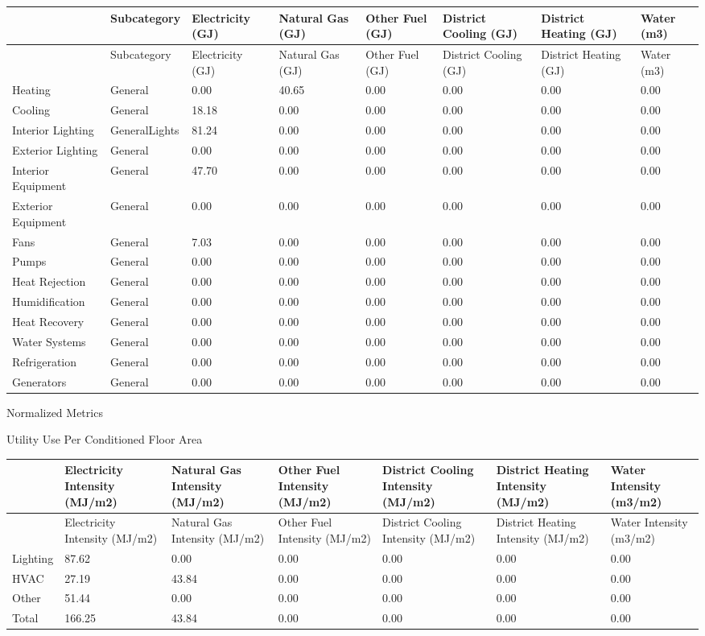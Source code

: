 {\scriptsize
\begin{longtable}[c]{>{\raggedright}p{0.75in}>{\raggedright}p{0.75in}>{\raggedright}p{0.75in}>{\raggedright}p{0.75in}>{\raggedright}p{0.75in}>{\raggedright}p{0.75in}>{\raggedright}p{0.75in}>{\raggedright}p{0.75in}}
\toprule 
~ & Subcategory & Electricity (GJ) & Natural Gas (GJ) & Other Fuel (GJ) & District Cooling (GJ) & District Heating (GJ) & Water (m3) \tabularnewline
\midrule
\endfirsthead

\toprule 
~ & Subcategory & Electricity (GJ) & Natural Gas (GJ) & Other Fuel (GJ) & District Cooling (GJ) & District Heating (GJ) & Water (m3) \tabularnewline
\midrule
\endhead

Heating & General & 0.00 & 40.65 & 0.00 & 0.00 & 0.00 & 0.00 \tabularnewline
Cooling & General & 18.18 & 0.00 & 0.00 & 0.00 & 0.00 & 0.00 \tabularnewline
Interior Lighting & GeneralLights & 81.24 & 0.00 & 0.00 & 0.00 & 0.00 & 0.00 \tabularnewline
Exterior Lighting & General & 0.00 & 0.00 & 0.00 & 0.00 & 0.00 & 0.00 \tabularnewline
Interior Equipment & General & 47.70 & 0.00 & 0.00 & 0.00 & 0.00 & 0.00 \tabularnewline
Exterior Equipment & General & 0.00 & 0.00 & 0.00 & 0.00 & 0.00 & 0.00 \tabularnewline
Fans & General & 7.03 & 0.00 & 0.00 & 0.00 & 0.00 & 0.00 \tabularnewline
Pumps & General & 0.00 & 0.00 & 0.00 & 0.00 & 0.00 & 0.00 \tabularnewline
Heat Rejection & General & 0.00 & 0.00 & 0.00 & 0.00 & 0.00 & 0.00 \tabularnewline
Humidification & General & 0.00 & 0.00 & 0.00 & 0.00 & 0.00 & 0.00 \tabularnewline
Heat Recovery & General & 0.00 & 0.00 & 0.00 & 0.00 & 0.00 & 0.00 \tabularnewline
Water Systems & General & 0.00 & 0.00 & 0.00 & 0.00 & 0.00 & 0.00 \tabularnewline
Refrigeration & General & 0.00 & 0.00 & 0.00 & 0.00 & 0.00 & 0.00 \tabularnewline
Generators & General & 0.00 & 0.00 & 0.00 & 0.00 & 0.00 & 0.00 \tabularnewline
\bottomrule
\end{longtable}}

Normalized Metrics

Utility Use Per Conditioned Floor Area

\begin{longtable}[c]{>{\raggedright}p{0.85in}>{\raggedright}p{0.85in}>{\raggedright}p{0.85in}>{\raggedright}p{0.85in}>{\raggedright}p{0.85in}>{\raggedright}p{0.85in}>{\raggedright}p{0.85in}}
\toprule 
~ & Electricity Intensity (MJ/m2) & Natural Gas Intensity (MJ/m2) & Other Fuel Intensity (MJ/m2) & District Cooling Intensity (MJ/m2) & District Heating Intensity (MJ/m2) & Water Intensity (m3/m2) \tabularnewline
\midrule
\endfirsthead

\toprule 
~ & Electricity Intensity (MJ/m2) & Natural Gas Intensity (MJ/m2) & Other Fuel Intensity (MJ/m2) & District Cooling Intensity (MJ/m2) & District Heating Intensity (MJ/m2) & Water Intensity (m3/m2) \tabularnewline
\midrule
\endhead

Lighting & 87.62 & 0.00 & 0.00 & 0.00 & 0.00 & 0.00 \tabularnewline
HVAC & 27.19 & 43.84 & 0.00 & 0.00 & 0.00 & 0.00 \tabularnewline
Other & 51.44 & 0.00 & 0.00 & 0.00 & 0.00 & 0.00 \tabularnewline
Total & 166.25 & 43.84 & 0.00 & 0.00 & 0.00 & 0.00 \tabularnewline
\bottomrule
\end{longtable}

